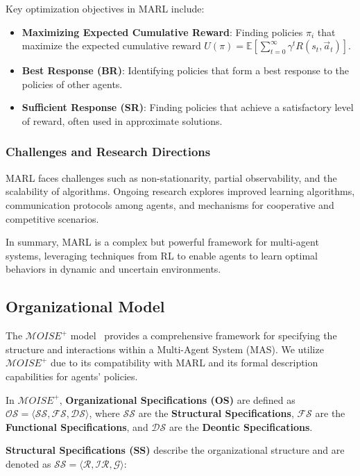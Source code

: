 \documentclass[conference]{IEEEtran}
\begin{document}
Key optimization objectives in MARL include:

\begin{itemize}
    \item \textbf{Maximizing Expected Cumulative Reward}: Finding policies $\pi_i$ that maximize the expected cumulative reward $U(\pi) = \mathbb{E}\left[\sum_{t=0}^{\infty} \gamma^t R(s_t, \vec{a}_t)\right]$.
    \item \textbf{Best Response (BR)}: Identifying policies that form a best response to the policies of other agents.
    \item \textbf{Sufficient Response (SR)}: Finding policies that achieve a satisfactory level of reward, often used in approximate solutions.
\end{itemize}

\subsubsection{Challenges and Research Directions}

MARL faces challenges such as non-stationarity, partial observability, and the scalability of algorithms. Ongoing research explores improved learning algorithms, communication protocols among agents, and mechanisms for cooperative and competitive scenarios.

In summary, MARL is a complex but powerful framework for multi-agent systems, leveraging techniques from RL to enable agents to learn optimal behaviors in dynamic and uncertain environments.


\subsection{Organizational Model}

The $\mathcal{M}OISE^+$ model~\cite{Hubner2007} provides a comprehensive framework for specifying the structure and interactions within a Multi-Agent System (MAS). We utilize $\mathcal{M}OISE^+$ due to its compatibility with MARL and its formal description capabilities for agents' policies.

In $\mathcal{M}OISE^+$, \textbf{Organizational Specifications (OS)} are defined as $\mathcal{OS} = \langle \mathcal{SS}, \mathcal{FS}, \mathcal{DS} \rangle$, where $\mathcal{SS}$ are the \textbf{Structural Specifications}, $\mathcal{FS}$ are the \textbf{Functional Specifications}, and $\mathcal{DS}$ are the \textbf{Deontic Specifications}.

\textbf{Structural Specifications (SS)} describe the organizational structure and are denoted as $\mathcal{SS} = \langle \mathcal{R}, \mathcal{IR}, \mathcal{G} \rangle$:
\end{document}
